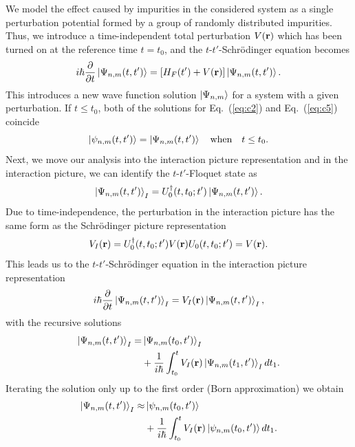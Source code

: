 \documentclass[
 reprint,
 amsmath,amssymb,
 aps,
 prb,
]{revtex4-2}
\begin{document}
\begin{appendix}
We model the effect caused by impurities in the considered system as a single perturbation potential formed by a group of randomly distributed impurities.
Thus, we introduce a time-independent total perturbation $V(\vb{r})$ which has been turned on at the reference time $t=t_0$, and the $t$-$t'$-Schrödinger equation becomes
\begin{equation} \label{eq:c5}
  i \hbar \pdv{t}\ket{\Psi_{n,m}(t,t')} =
  \left[H_F(t') + V(\vb{r}) \right]\ket{\Psi_{n,m}(t,t')}.
\end{equation}
This introduces a new wave function solution $\ket{\Psi_{n,m}}$ for a system with a given perturbation. If $t\leq t_0$, both of the solutions for Eq.~(\ref{eq:c2}) and Eq.~(\ref{eq:c5}) coincide
\begin{equation} \label{eq:c6}
  \ket{\psi_{n,m}(t,t')} =\ket{\Psi_{n,m}(t,t')} \quad
  \text{when} \quad
  t \leq t_0.
\end{equation}
Next, we move our analysis into the interaction picture representation \cite{bruus04,mahan00} and in the interaction picture, we can identify the $t$-$t'$-Floquet state as
\begin{equation} \label{eq:c7}
  \ket{\Psi_{n,m}(t,t')}_I = U_0^{\dagger}(t,t_0;t')
  \ket{\Psi_{n,m}(t,t')}.
\end{equation}
Due to time-independence, the perturbation in the interaction picture has the same form as the Schrödinger picture representation
\begin{equation} \label{eq:c8}
  V_I(\vb{r}) = U_0^{\dagger}(t,t_0;t')V(\vb{r})U_0(t,t_0;t') =
  V(\vb{r}).
\end{equation}
This leads us to the $t$-$t'$-Schrödinger equation in the interaction picture representation
\begin{equation} \label{eq:c9}
  i \hbar \pdv{t}\ket{\Psi_{n,m}(t,t')}_I =
  V_I(\vb{r})\ket{\Psi_{n,m}(t,t')}_I,
\end{equation}
with the recursive solutions \cite{bruus04,mahan00}
\begin{equation} \label{eq:c10}
  \begin{aligned}
  \ket{\Psi_{n,m}(t,t')}_I = &\ket{\Psi_{n,m}(t_0,t')}_I \\
  &+
  \frac{1}{i\hbar}
  \int_{t_0}^t
  V_I(\vb{r}) \ket{\Psi_{n,m}(t_1,t')}_I dt_1.
  \end{aligned}
\end{equation}
Iterating the solution only up to the first order (Born approximation) we obtain
\begin{equation} \label{eq:c11}
  \begin{aligned}
    \ket{\Psi_{n,m}(t,t')}_I \approx &\ket{\psi_{n,m}(t_0,t')} \\
    &+
    \frac{1}{i\hbar}
    \int_{t_0}^t
    V_I(\vb{r}) \ket{\psi_{n,m}(t_0,t')} dt_1.
  \end{aligned}
\end{equation}


\end{appendix}
\end{document}
